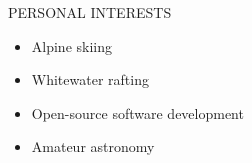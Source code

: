 \documentclass{resume} %
\begin{document}
\begin{rSection}{PERSONAL INTERESTS}
	\small
	\begin{minipage}{0.17\textwidth}
		\begin{itemize}[leftmargin=*]
			\item Alpine skiing
		\end{itemize}
	\end{minipage}
	\begin{minipage}{0.23\textwidth}
		\begin{itemize}[leftmargin=*]
			\item Whitewater rafting	
		\end{itemize}
	\end{minipage}
	\begin{minipage}{0.35\textwidth}
		\begin{itemize}[leftmargin=*]
			\item Open-source software development
		\end{itemize}
	\end{minipage}
	\begin{minipage}{0.2\textwidth}
		\begin{itemize}[leftmargin=*]
			\item Amateur astronomy
		\end{itemize}
	\end{minipage}
\end{rSection}
\end{document}
